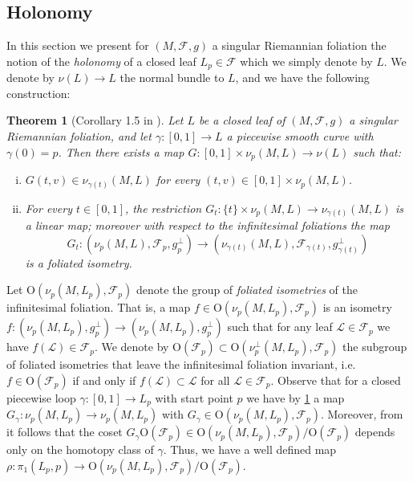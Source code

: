 \documentclass[12pt,a4paper,reqno]{amsart}
\newtheorem{theorem}{Theorem}[section]
\theoremstyle{definition}
\numberwithin{equation}{section}
\newcommand{\fol}{\mathcal{F}}
\newcommand{\Or}{\mathrm{O}}
\begin{document}
\subsection{Holonomy}

In this section we present for $(M,\fol,g)$ a singular Riemannian foliation the notion of the \emph{holonomy} of a closed leaf $L_p\in \fol$  which we simply denote by $L$. We denote by $\nu(L)\to L$ the normal bundle to $L$, and  we have the following construction:
\begin{theorem}[Corollary 1.5 in \cite{MendesRadeschi2019}]\th\label{T:  holonomy map of curve}
Let $L$ be a closed leaf of $(M,\fol,g)$ a singular Riemannian foliation, and let $\gamma\colon [0,1]\to L$ a piecewise smooth curve with $\gamma(0) = p$. Then there exists a map $G\colon [0,1]\times \nu_p(M,L)\to \nu(L)$ such that:
\begin{enumerate}[(i)]
\item $G(t,v) \in \nu_{\gamma(t)}(M,L)$ for every $(t,v)\in [0,1]\times \nu_p(M,L)$.
\item For every $t\in [0,1]$, the restriction $G_t\colon \{t\}\times \nu_p (M,L)\to \nu_{\gamma(t)}(M,L)$ is a linear map; moreover with respect to the infinitesimal foliations the map 
\[
G_t\colon (\nu_p(M,L),\fol_p,g_p^\perp)\to (\nu_{\gamma(t)}(M,L),\fol_{\gamma(t)},g_{\gamma(t)}^\perp)
\]
is a foliated isometry. 
\end{enumerate}
\end{theorem}

Let $\Or(\nu_p(M,L_p),\fol_p)$ denote the group of \emph{foliated isometries} of the infinitesimal foliation. That is, a map $f\in \Or(\nu_p(M,L_p),\fol_p)$ is an isometry $f\colon (\nu_p(M,L_p),g_p^\perp)\to (\nu_p(M,L_p),g_p^\perp)$ such that for any leaf $\mathcal{L}\in \fol_p$ we have $f(\mathcal{L})\in \fol_p$. We denote by $\Or(\fol_p)\subset\Or(\nu_p^\perp(M,L_p),\fol_p)$ the subgroup of foliated isometries that leave the infinitesimal foliation invariant, i.e. $f\in \Or(\fol_p)$ if and only if $f(\mathcal{L})\subset \mathcal{L}$ for all $\mathcal{L}\in \fol_p$. Observe that for a closed piecewise loop $\gamma\colon [0,1]\to L_p$ with start point $p$ we have by \th\ref{T:  holonomy map of curve} a map $G_{\gamma}\colon \nu_p(M,L_p)\to \nu_p(M,L_p)$ with $G_{\gamma}\in \Or(\nu_p(M,L_p),\fol_p)$. Moreover, from \cite[Proposition 2.5]{Corro2023} it follows that the coset $G_{\gamma}\Or(\fol_p)\in \Or(\nu_p(M,L_p),\fol_p)/\Or(\fol_p)$ depends only on the homotopy class of $\gamma$. Thus, we have a well defined map $\rho\colon \pi_1(L_p,p)\to \Or(\nu_p(M,L_p),\fol_p)/\Or(\fol_p)$.
\end{document}
